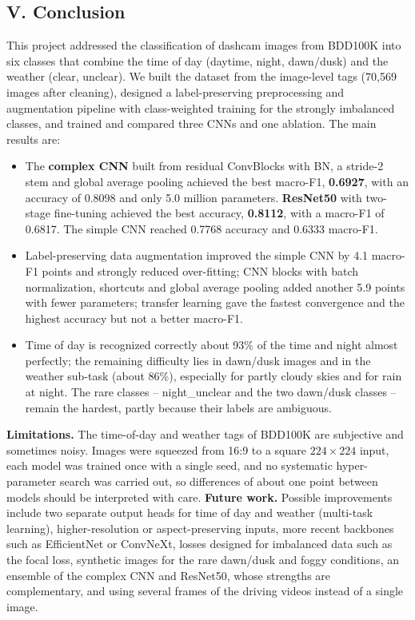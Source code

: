 \documentclass[12pt,letterpaper]{article}
\begin{document}
\subsection{V. Conclusion}
This project addressed the classification of dashcam images from BDD100K into six classes that combine the time of day
(daytime, night, dawn/dusk) and the weather (clear, unclear). We built the dataset from the image-level tags (70{,}569
images after cleaning), designed a label-preserving preprocessing and augmentation pipeline with class-weighted training
for the strongly imbalanced classes, and trained and compared three CNNs and one ablation. The main results are:
\begin{itemize}
  \item The \textbf{complex CNN} built from residual ConvBlocks with BN, a stride-2 stem and global average pooling
        achieved the best macro-F1, \textbf{0.6927}, with an accuracy of 0.8098 and only 5.0 million parameters.
        \textbf{ResNet50} with two-stage fine-tuning achieved the best accuracy, \textbf{0.8112}, with a macro-F1 of
        0.6817. The simple CNN reached 0.7768 accuracy and 0.6333 macro-F1.
  \item Label-preserving data augmentation improved the simple CNN by 4.1 macro-F1 points and strongly reduced
        over-fitting; CNN blocks with batch normalization, shortcuts and global average pooling added another 5.9 points
        with fewer parameters; transfer learning gave the fastest convergence and the highest accuracy but not a better
        macro-F1.
  \item Time of day is recognized correctly about 93\% of the time and night almost perfectly; the remaining difficulty
        lies in dawn/dusk images and in the weather sub-task (about 86\%), especially for partly cloudy skies and for
        rain at night. The rare classes -- night\_unclear and the two dawn/dusk classes -- remain the hardest, partly
        because their labels are ambiguous.
\end{itemize}
\textbf{Limitations.} The time-of-day and weather tags of BDD100K are subjective and sometimes noisy. Images were
squeezed from 16:9 to a square $224\times224$ input, each model was trained once with a single seed, and no systematic
hyper-parameter search was carried out, so differences of about one point between models should be interpreted with
care. \textbf{Future work.} Possible improvements include two separate output heads for time of day and weather
(multi-task learning), higher-resolution or aspect-preserving inputs, more recent backbones such as EfficientNet or
ConvNeXt, losses designed for imbalanced data such as the focal loss, synthetic images for the rare dawn/dusk and foggy
conditions, an ensemble of the complex CNN and ResNet50, whose strengths are complementary, and using several frames of
the driving videos instead of a single image.
\end{document}
